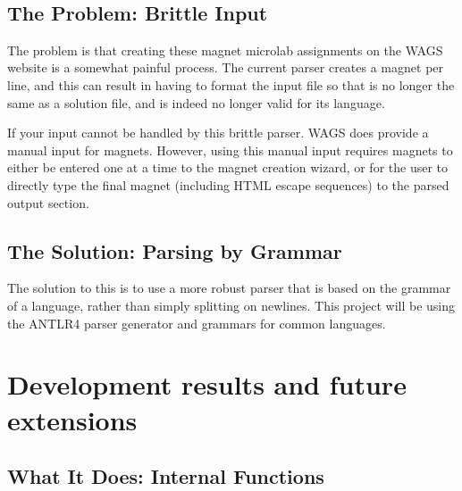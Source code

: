 \documentclass[letter,10pt]{article}
\begin{document}
~


\subsection{The Problem: Brittle Input}

The problem is that creating these magnet microlab assignments on the 
WAGS website is a somewhat painful process. The current parser creates 
a magnet per line, and this can result in having to format the input 
file so that is no longer the same as a solution file, and is indeed no 
longer valid for its language.


If your input cannot be handled by this brittle parser. WAGS does 
provide a manual input for magnets. However, using this manual input 
requires magnets to either be entered one at a time to the magnet 
creation wizard, or for the user to directly type the final magnet 
(including HTML escape sequences) to the parsed output section. 


\subsection{The Solution: Parsing by Grammar}

The solution to this is to use a more robust parser that is based on 
the grammar of a language, rather than simply splitting on newlines. 
This project will be using the ANTLR4 parser 
generator\cite{antlr-reference} and grammars for common 
languages\cite{antlr-grammars-project}.



\section{Development results and future extensions}

\subsection{What It Does: Internal Functions}
\end{document}
